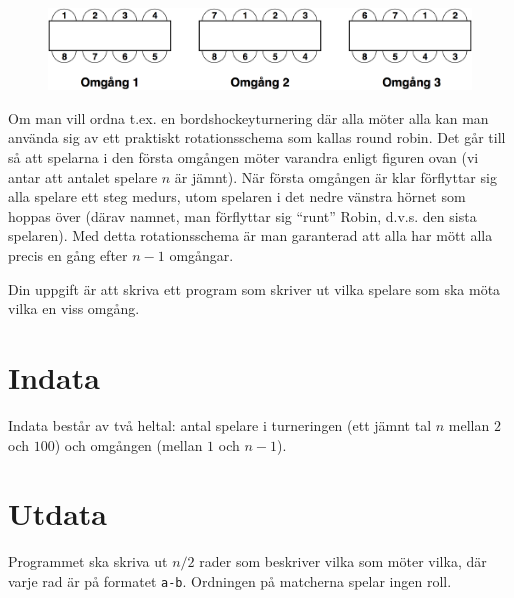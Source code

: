
\begin{figure}[h!]
  \centering
  \includegraphics[scale=1.8]{turnering}
\end{figure}

Om man vill ordna t.ex. en bordshockeyturnering där alla möter alla kan man använda sig av ett praktiskt rotationsschema som kallas round robin.
Det går till så att spelarna i den första omgången möter varandra enligt figuren ovan (vi antar att antalet spelare $n$ är jämnt).
När första omgången är klar förflyttar sig alla spelare ett steg medurs, utom spelaren i det nedre vänstra hörnet som hoppas över (därav namnet, man förflyttar sig ``runt'' Robin, d.v.s. den sista spelaren).
Med detta rotationsschema är man garanterad att alla har mött alla precis en gång efter $n-1$ omgångar.

Din uppgift är att skriva ett program som skriver ut vilka spelare som ska möta vilka en viss omgång.

\section*{Indata}
Indata består av två heltal: antal spelare i turneringen (ett jämnt tal $n$ mellan $2$ och $100$) och omgången (mellan $1$ och $n-1$).

\section*{Utdata}
Programmet ska skriva ut $n/2$ rader som beskriver vilka som möter vilka, där varje rad är på formatet \texttt{a-b}.
Ordningen på matcherna spelar ingen roll.
